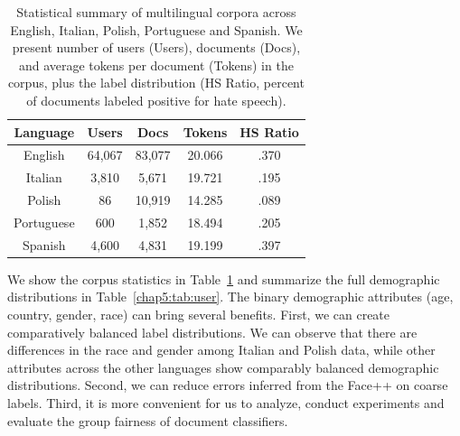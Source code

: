 \begin{table}[htp]
\centering
\begin{tabular}{c||cccc}
Language & Users & Docs & Tokens & HS Ratio \\\hline\hline
English & 64,067 & 83,077 & 20.066 & .370 \\
Italian & 3,810 & 5,671 & 19.721 & .195 \\
Polish & 86 & 10,919 & 14.285 & .089 \\
Portuguese & 600 & 1,852 & 18.494 & .205 \\
Spanish & 4,600 & 4,831 & 19.199 & .397
\end{tabular}
\caption{Statistical summary of multilingual corpora across English, Italian, Polish, Portuguese and Spanish. We present number of users (Users), documents (Docs), and average tokens per document (Tokens) in the corpus, 
plus the label distribution (HS Ratio, percent of documents labeled positive for hate speech).}
\label{chap5:tab:corpus}
\end{table}

We show the corpus statistics in Table~\ref{chap5:tab:corpus} and summarize the full demographic distributions in Table~\ref{chap5:tab:user}. 
The binary demographic attributes (age, country, gender, race) can bring several benefits. 
First, we can create comparatively balanced label distributions. 
We can observe that there are differences in the race and gender among Italian and Polish data, while other attributes across the other languages show comparably balanced demographic distributions.
Second, we can reduce errors inferred from the Face++ on coarse labels.
Third, it is more convenient for us to analyze, conduct experiments and evaluate the group fairness of document classifiers.


